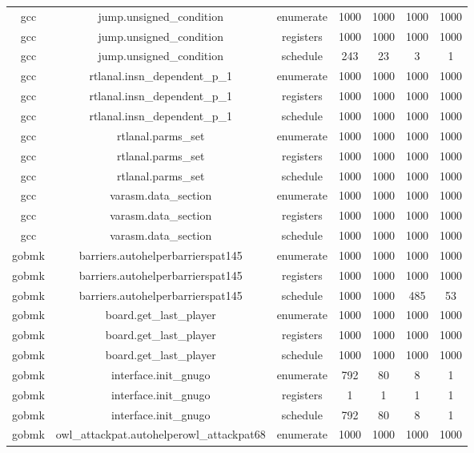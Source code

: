 \begin{center}
\begin{longtable}{c|c|c|c|c|c|c}
		\hline
		gcc & jump.unsigned\_condition & enumerate & 1000 & 1000 & 1000 & 1000 \\
		gcc & jump.unsigned\_condition & registers & 1000 & 1000 & 1000 & 1000 \\
		gcc & jump.unsigned\_condition & schedule & 243 & 23 & 3 & 1 \\
		\hline
		gcc & rtlanal.insn\_dependent\_p\_1 & enumerate & 1000 & 1000 & 1000 & 1000 \\
		gcc & rtlanal.insn\_dependent\_p\_1 & registers & 1000 & 1000 & 1000 & 1000 \\
		gcc & rtlanal.insn\_dependent\_p\_1 & schedule & 1000 & 1000 & 1000 & 1000 \\
		\hline
		gcc & rtlanal.parms\_set & enumerate & 1000 & 1000 & 1000 & 1000 \\
		gcc & rtlanal.parms\_set & registers & 1000 & 1000 & 1000 & 1000 \\
		gcc & rtlanal.parms\_set & schedule & 1000 & 1000 & 1000 & 1000 \\
		\hline
		gcc & varasm.data\_section & enumerate & 1000 & 1000 & 1000 & 1000 \\
		gcc & varasm.data\_section & registers & 1000 & 1000 & 1000 & 1000 \\
		gcc & varasm.data\_section & schedule & 1000 & 1000 & 1000 & 1000 \\
		\hline
		gobmk & barriers.autohelperbarrierspat145 & enumerate & 1000 & 1000 & 1000 & 1000 \\
		gobmk & barriers.autohelperbarrierspat145 & registers & 1000 & 1000 & 1000 & 1000 \\
		gobmk & barriers.autohelperbarrierspat145 & schedule & 1000 & 1000 & 485 & 53 \\
		\hline
		gobmk & board.get\_last\_player & enumerate & 1000 & 1000 & 1000 & 1000 \\
		gobmk & board.get\_last\_player & registers & 1000 & 1000 & 1000 & 1000 \\
		gobmk & board.get\_last\_player & schedule & 1000 & 1000 & 1000 & 1000 \\
		\hline
		gobmk & interface.init\_gnugo & enumerate & 792 & 80 & 8 & 1 \\
		gobmk & interface.init\_gnugo & registers & 1 & 1 & 1 & 1 \\
		gobmk & interface.init\_gnugo & schedule & 792 & 80 & 8 & 1 \\
		\hline
		gobmk & owl\_attackpat.autohelperowl\_attackpat68 & enumerate & 1000 & 1000 & 1000 & 1000 \\

\end{longtable}
\end{center}
